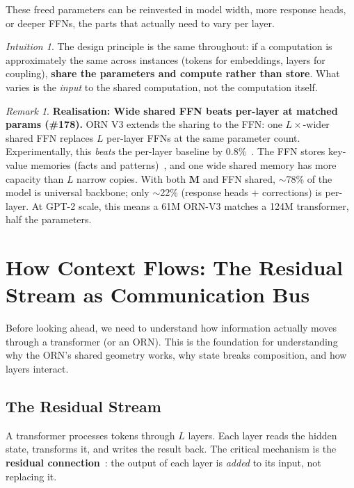 \documentclass[11pt, a4paper]{article}
\newcommand{\M}{\mathbf{M}}
\theoremstyle{remark}
\newtheorem*{remark}{Remark}
\newtheorem*{intuition}{Intuition}
\begin{document}
\noindent
These freed parameters can be reinvested in model width, more response heads, or deeper FFNs, the parts that actually need to vary per layer.

\begin{intuition}
The design principle is the same throughout: if a computation is approximately the same across instances (tokens for embeddings, layers for coupling), \textbf{share the parameters and compute rather than store}.
What varies is the \emph{input} to the shared computation, not the computation itself.
\end{intuition}

\begin{remark}
\textbf{Realisation: Wide shared FFN beats per-layer at matched params (\#178).}
ORN V3 extends the sharing to the FFN: one $L\times$-wider shared FFN replaces $L$ per-layer FFNs at the same parameter count.
Experimentally, this \emph{beats} the per-layer baseline by 0.8\%~\cite{onewideffn2023, ffnfusion2025}.
The FFN stores key-value memories (facts and patterns)~\cite{geva2021ffn}, and one wide shared memory has more capacity than $L$ narrow copies.
With both $\M$ and FFN shared, $\sim$78\% of the model is universal backbone; only $\sim$22\% (response heads + corrections) is per-layer.
At GPT-2 scale, this means a 61M ORN-V3 matches a 124M transformer, half the parameters.
\end{remark}


\section{How Context Flows: The Residual Stream as Communication Bus}
\label{sec:residual-flow}

Before looking ahead, we need to understand how information actually moves through a transformer (or an ORN).
This is the foundation for understanding why the ORN's shared geometry works, why state breaks composition, and how layers interact.

\subsection{The Residual Stream}

A transformer processes tokens through $L$ layers.
Each layer reads the hidden state, transforms it, and writes the result back.
The critical mechanism is the \textbf{residual connection}~\cite{he2016deep}: the output of each layer is \emph{added} to its input, not replacing it.
\end{document}
